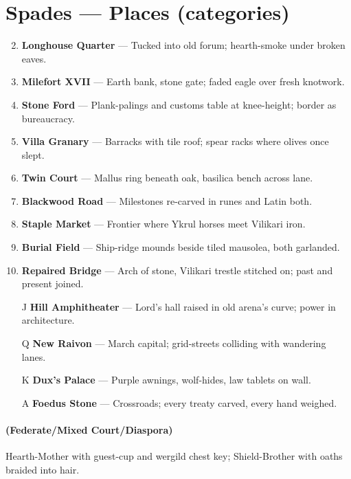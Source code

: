 \section*{Spades --- Places (categories)}
\label{sec:vilikari-places}
\begin{enumerate}
\setcounter{enumi}{1}
\item \textbf{Longhouse Quarter} --- Tucked into old forum; hearth-smoke under broken eaves.
\item \textbf{Milefort XVII} --- Earth bank, stone gate; faded eagle over fresh knotwork.
\item \textbf{Stone Ford} --- Plank-palings and customs table at knee-height; border as bureaucracy.
\item \textbf{Villa Granary} --- Barracks with tile roof; spear racks where olives once slept.
\item \textbf{Twin Court} --- Mallus ring beneath oak, basilica bench across lane.
\item \textbf{Blackwood Road} --- Milestones re-carved in runes and Latin both.
\item \textbf{Staple Market} --- Frontier where Ykrul horses meet Vilikari iron.
\item \textbf{Burial Field} --- Ship-ridge mounds beside tiled mausolea, both garlanded.
\item \textbf{Repaired Bridge} --- Arch of stone, Vilikari trestle stitched on; past and present joined.
\item[J] \textbf{Hill Amphitheater} --- Lord's hall raised in old arena's curve; power in architecture.
\item[Q] \textbf{New Raivon} --- March capital; grid-streets colliding with wandering lanes.
\item[K] \textbf{Dux's Palace} --- Purple awnings, wolf-hides, law tablets on wall.
\item[A] \textbf{Foedus Stone} --- Crossroads; every treaty carved, every hand weighed.
\end{enumerate}

\paragraph*{(Federate/Mixed Court/Diaspora)} Hearth-Mother with guest-cup and wergild chest key; Shield-Brother with oaths braided into hair.

